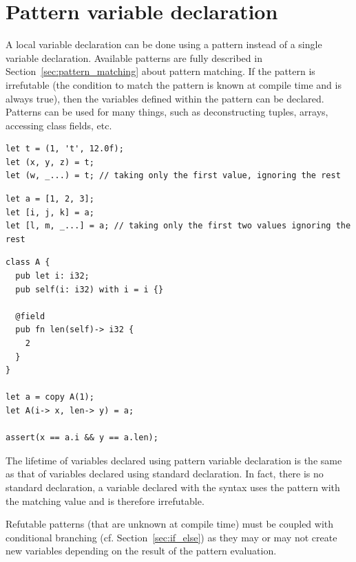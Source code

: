 \section{Pattern variable declaration}
\label{sec:pattern_vdecl}

A local variable declaration can be done using a pattern instead of a single
variable declaration. Available patterns are fully described in
Section~\ref{sec:pattern_matching} about pattern matching. If the pattern is
irrefutable (the condition to match the pattern is known at compile time and is
always true), then the variables defined within the pattern can be declared.
Patterns can be used for many things, such as deconstructing tuples, arrays,
accessing class fields, etc.

\begin{lstlisting}[style=coloredverbatim, escapechar=@, caption=Tuple deconstruction]
let t = (1, 't', 12.0f);
let (x, y, z) = t;
let (w, _...) = t; // taking only the first value, ignoring the rest
\end{lstlisting}

\begin{lstlisting}[style=coloredverbatim, escapechar=@, caption=Array deconstruction]
let a = [1, 2, 3];
let [i, j, k] = a;
let [l, m, _...] = a; // taking only the first two values ignoring the rest
\end{lstlisting}

\begin{lstlisting}[style=coloredverbatim, caption=Class field access]
class A {
  pub let i: i32;
  pub self(i: i32) with i = i {}

  @field
  pub fn len(self)-> i32 {
    2
  }
}

let a = copy A(1);
let A(i-> x, len-> y) = a;

assert(x == a.i && y == a.len);
\end{lstlisting}

The lifetime of variables declared using pattern variable declaration is the
same as that of variables declared using standard declaration. In fact, there is
no standard declaration, a variable declared with the syntax  uses the pattern  with the matching value 
and is therefore irrefutable.

Refutable patterns (that are unknown at compile time) must be coupled with
conditional branching (cf. Section~\ref{sec:if_else}) as they may or may not
create new variables depending on the result of the pattern evaluation.

